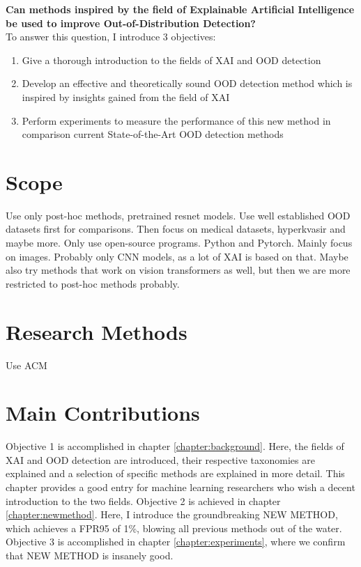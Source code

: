 \documentclass[UKenglish]{uiomasterthesis} %
\theoremstyle{definition}
\begin{document}
\textbf{Can methods inspired by the field of Explainable Artificial Intelligence be used to improve Out-of-Distribution Detection?}
\\

To answer this question, I introduce 3 objectives:

\begin{enumerate}
  \item Give a thorough introduction to the fields of XAI and OOD detection
  \item Develop an effective and theoretically sound OOD detection method which is inspired by insights gained from the field of XAI
  \item Perform experiments to measure the performance of this new method in comparison current State-of-the-Art OOD detection methods
\end{enumerate}

\section{Scope}

Use only post-hoc methods, pretrained resnet models. Use well established OOD datasets first for comparisons. Then focus on medical datasets, hyperkvasir and maybe more. Only use open-source programs. Python and Pytorch. Mainly focus on images. Probably only CNN models, as a lot of XAI is based on that. Maybe also try methods that work on vision transformers as well, but then we are more restricted to post-hoc methods probably.

\section{Research Methods}

Use ACM


\section{Main Contributions}

Objective 1 is accomplished in chapter \ref{chapter:background}. Here, the fields of XAI and OOD detection are introduced, their respective taxonomies are explained and a selection of specific methods are explained in more detail. This chapter provides a good entry for machine learning researchers who wish a decent introduction to the two fields. Objective 2 is achieved in chapter \ref{chapter:newmethod}. Here, I introduce the groundbreaking NEW METHOD, which achieves a FPR95 of 1\%, blowing all previous methods out of the water. Objective 3 is accomplished in chapter \ref{chapter:experiments}, where we confirm that NEW METHOD is insanely good.
\end{document}
